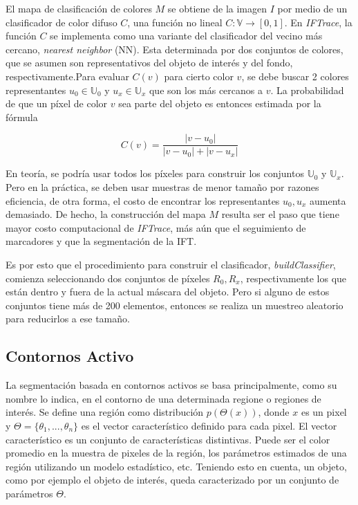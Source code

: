 \documentclass[a4paper,10pt]{article}
\begin{document}
El mapa de clasificación de colores $M$ se obtiene de la imagen $I$ por medio de un
clasificador de color difuso $C$, una función no lineal $C : \mathbb{V} \to [0,1]$.
En \textit{IFTrace}, la función $C$ se implementa como una variante del clasificador
del vecino más cercano, \textit{nearest neighbor} (NN). Esta determinada por dos conjuntos de
colores, que se asumen son representativos del objeto de interés y del fondo, respectivamente.Para evaluar $C(v)$ para
cierto color $v$, se debe buscar 2 colores representantes $u_{0} \in \mathbb{U}_{0}$
y $u_{x} \in \mathbb{U}_{x}$ que son los más cercanos a $v$.
La probabilidad de que un píxel de color $v$ sea parte del objeto es entonces estimada
por la fórmula

\begin{equation}
   \label{eq:IFTrace-color-classifier}
   C(v) = \frac{|v - u_{0}|}{|v - u_{0}| + |v - u_{x}|}
\end{equation}

En teoría, se podría usar todos los píxeles para construir los conjuntos
$\mathbb{U}_{0}$ y $\mathbb{U}_{x}$. Pero en la práctica, se deben usar muestras
de menor tamaño por razones eficiencia, de otra forma, el costo de encontrar los
representantes $u_{0},u_{x}$ aumenta demasiado. De hecho, la construcción del mapa
$M$ resulta ser el paso que tiene mayor costo computacional de \textit{IFTrace}, más
aún que el seguimiento de marcadores y que la segmentación de la IFT.

Es por esto que el procedimiento para construir el clasificador,
\textit{buildClassifier}, comienza seleccionando dos conjuntos de píxeles
$R_{0},R_{x}$, respectivamente los que están dentro y fuera de la actual máscara
del objeto. Pero si alguno de estos conjuntos tiene más de 200 elementos,
entonces se realiza un muestreo aleatorio para reducirlos a ese tamaño.

\subsection{Contornos Activo}

La segmentación basada en contornos activos se basa principalmente, como su nombre lo indica, en el contorno de una determinada 
regione o regiones de interés. Se define una región como distribución $p(\Theta(x))$, donde $x$ es un pixel y $\Theta = \{\theta_{1}, ..., \theta_{n}\}$ es el
vector característico definido para cada pixel. El vector característico es un conjunto de características distintivas. Puede ser el color promedio en la muestra de
pixeles de la región, los parámetros estimados de una región utilizando un modelo estadístico, etc.
 Teniendo esto en cuenta, un objeto, como por ejemplo el objeto de interés, queda caracterizado por un conjunto de parámetros $\Theta$.
\end{document}
